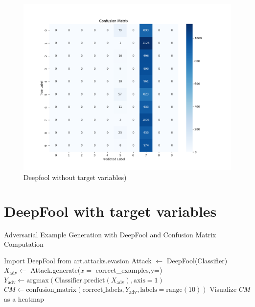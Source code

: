\documentclass[11pt,onside]{article}
\begin{document}
\begin{figure}[h]
\centering
\includegraphics[width=1\textwidth]{V1_images/DeepFool_withOUT_target.png}
\caption{Deepfool without target variables)}
\label{fig: DeepFool without target variables}
\end{figure}


\section{DeepFool with target variables}

\begin{algorithm}[H]
\caption{Adversarial Example Generation with DeepFool and Confusion Matrix Computation}
\begin{algorithmic}[1]
\State Import DeepFool from art.attacks.evasion
\State Attack $\gets$ DeepFool(Classifier)
\State $X_{\text{adv}} \gets$ Attack.generate($x=$ correct\_examples,y=)
\State $Y_{\text{adv}} \gets \text{argmax}(\text{Classifier.predict}(X_{\text{adv}}), \text{axis}=1)$
\State $CM \gets \text{confusion\_matrix}(\text{correct\_labels}, Y_{\text{adv}}, \text{labels}=\text{range}(10))$
\State Visualize $CM$ as a heatmap
\end{algorithmic}
\end{algorithm}
\end{document}
